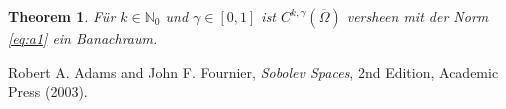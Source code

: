 \documentclass[
paper=a4,
bibtotocnumbered,
liststotocnumbered,
tablecaptionabove,
pointlessnumbers,
twoside,
openright,
10pt
]
{report}
\newtheorem{thm}{Theorem}[chapter]
\theoremstyle{definition}
\numberwithin{equation}{chapter}
\begin{document}
\begin{thm}
Für $k\in \mathbb N_0$ und $\gamma \in [0,1]$ ist $C^{k,\gamma}(\overline{\Omega})$ versheen mit der Norm \eqref{eq:a1} ein Banachraum.
\end{thm}
\begin{thebibliography}{xxx}
 Robert A. Adams and John F.  Fournier, \textit{Sobolev Spaces}, 2nd Edition, Academic Press (2003).
\end{thebibliography}
\end{document}
